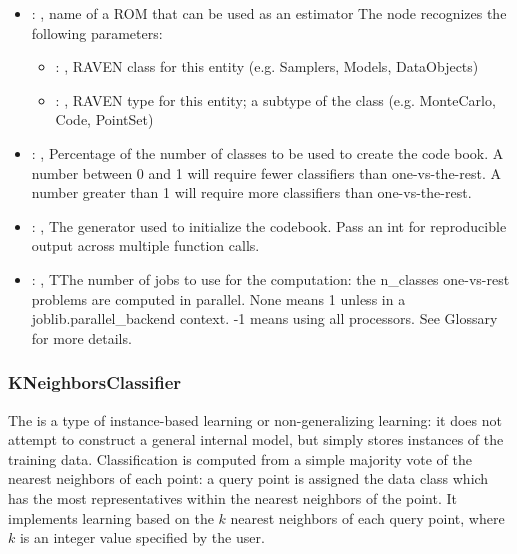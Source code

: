 \begin{itemize}
    \item {}: , 
      name of a ROM that can be used as an estimator
      The  node recognizes the following parameters:
        \begin{itemize}
          \item {}: , 
            RAVEN class for this entity (e.g. Samplers, Models, DataObjects)
          \item {}: , 
            RAVEN type for this entity; a subtype of the class (e.g. MonteCarlo, Code, PointSet)
      \end{itemize}

    \item {}: , 
      Percentage of the number of classes to be used to create
      the code book. A number between 0 and 1 will require fewer classifiers
      than one-vs-the-rest. A number greater than 1 will require more classifiers
      than one-vs-the-rest.

    \item {}: , 
      The generator used to initialize the codebook. Pass an int
      for reproducible output across multiple function calls.

    \item {}: , 
      TThe number of jobs to use for the computation: the n\_classes one-vs-rest
      problems are computed in parallel. None means 1 unless in a joblib.parallel\_backend
      context. -1 means using all processors. See Glossary for more details.
  \end{itemize}


\subsubsection{KNeighborsClassifier}
  The  is a type of instance-based learning or
  non-generalizing learning: it does not attempt to construct a general internal
  model, but simply stores instances of the training data.                          Classification
  is computed from a simple majority vote of the nearest neighbors                          of each
  point: a query point is assigned the data class which has the most
  representatives within the nearest neighbors of the point.                          It implements
  learning based on the $k$ nearest neighbors of each query point,                          where
  $k$ is an integer value specified by the user.

